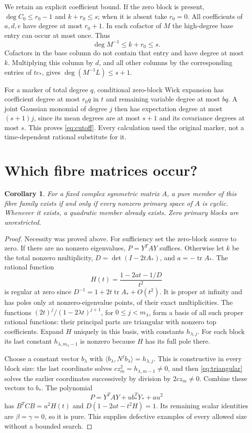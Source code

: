 \documentclass[11pt]{article}
\newtheorem{corollary}[theorem]{Corollary}
\theoremstyle{definition}\newtheorem{definition}[theorem]{Definition}
\theoremstyle{remark}\newtheorem{remark}[theorem]{Remark}
\begin{document}
We retain an explicit coefficient bound. If the zero block is
present, $\deg C_0\le r_0-1$ and $k+r_0\le s$; when it is
absent take $r_0=0$. All coefficients of $a,d,e$ have degree
at most $r_0+1$. In each cofactor of $M$ the high-degree base
entry can occur at most once. Thus
\[
 \deg M^{-1}\le k+r_0\le s.
\]
Cofactors in the base column do not contain that entry and
have degree at most $k$. Multiplying this column by $d$, and
all other columns by the corresponding entries of $tc_*$,
gives $\deg(M^{-1}L)\le s+1$.

For a marker of total degree $q$, conditional zero-block Wick
expansion has coefficient degree at most $r_0q$ in $t$ and
remaining variable degree at most $bq$. A joint Gaussian
monomial of degree $j$ then has expectation degree at most
$(s+1)j$, since its mean degrees are at most $s+1$ and its
covariance degrees at most $s$. This proves
\eqref{eq:cutoff}. Every calculation used the original marker,
not a time-dependent rational substitute for it.

\section{Which fibre matrices occur?}

\begin{corollary}\label{cor:matrixexistence}
For a fixed complex symmetric matrix $A$, a pure member of this
fibre family exists if and only if every nonzero primary space
of $A$ is cyclic. Whenever it exists, a quadratic member already
exists. Zero primary blocks are unrestricted.
\end{corollary}
\begin{proof}
Necessity was proved above. For sufficiency set the zero-block
source to zero. If there are no nonzero eigenvalues,
$P=Y^TAY$ suffices. Otherwise let $k$ be the total nonzero
multiplicity, $D=\det(I-2tA_*)$, and $a=-\operatorname{tr}A_*$.
The rational function
\[
 H(t)=\frac{1-2at-1/D}{t^2}
\]
is regular at zero since $D^{-1}=1+2t\operatorname{tr}A_*+O(t^2)$.
It is proper at infinity and has poles only at nonzero-eigenvalue
points, of their exact multiplicities. The functions
$(2t)^j/(1-2\lambda t)^{j+1}$, for $0\le j<m_\lambda$,
form a basis of all such proper rational functions: their
principal parts are triangular with nonzero top coefficients.
Expand $H$ uniquely in this basis, with constants $h_{\lambda,j}$.
For each block its last constant $h_{\lambda,m_\lambda-1}$
is nonzero because $H$ has its full pole there.

Choose a constant vector $b_\lambda$ with
$\langle b_\lambda,N^jb_\lambda\rangle=h_{\lambda,j}$.
This is constructive in every block size: the last coordinate
solves $c z_m^2=h_{\lambda,m-1}\ne0$, and then
\eqref{eq:triangular} solves the earlier coordinates successively
by division by $2cz_m\ne0$. Combine these vectors to $b_*$.
The polynomial
\[
 P=Y^TAY+u b_*^TY_*+a u^2
\]
has $B^TCB=u^2H(t)$ and
$D(1-2at-t^2H)=1$. Its remaining scalar identities are
$\beta=\gamma=0$, so it is pure. This supplies defective
examples of every allowed size without a bounded search.
\end{proof}
\end{document}
